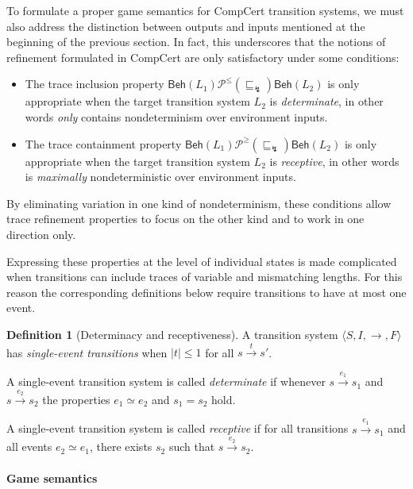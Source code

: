 \documentclass[11pt,oneside]{book}
\theoremstyle{definition}
\newtheorem{definition}[theorem]{Definition}
\newcommand{\kw}[1]{\ensuremath{ \mathsf{#1} }}
\newcommand{\refby}{\sqsubseteq} %
\begin{document}
To formulate a proper game semantics for
CompCert transition systems,
we must also address the distinction between
outputs and inputs mentioned
at the beginning of the previous section.
In fact,
this underscores that
the notions of refinement
formulated in CompCert
are only satisfactory under some conditions:
\begin{itemize}
  \item
    The trace inclusion property
    $\kw{Beh}(L_1)
     \mathrel{\mathcal{P}^\le(\refby_\lightning)}
     \kw{Beh}(L_2)$
    is only appropriate when
    the target transition system $L_2$
    is \emph{determinate},
    in other words \emph{only} contains nondeterminism
    over environment inputs.
  \item
    The trace containment property
    $\kw{Beh}(L_1)
     \mathrel{\mathcal{P}^\ge(\refby_\lightning)}
     \kw{Beh}(L_2)$
    is only appropriate when
    the target transition system $L_2$
    is \emph{receptive},
    in other words is \emph{maximally} nondeterministic
    over environment inputs.
\end{itemize}
By eliminating variation in one kind of nondeterminism,
these conditions allow trace refinement properties
to focus on the other kind
and to work in one direction only.

Expressing these properties at the level of individual states
is made complicated when transitions can include
traces of variable and mismatching lengths.
For this reason the corresponding definitions below
require transitions to have at most one event.

\begin{definition}[Determinacy and receptiveness] %
A transition system
$\langle S, I, {\rightarrow}, F \rangle$
has \emph{single-event transitions}
when $|t| \le 1$ for all $s \stackrel{t}{\rightarrow} s'$.

A single-event transition system is called
\emph{determinate}
if whenever
$s \stackrel{e_1}{\longrightarrow} s_1$ and
$s \stackrel{e_2}{\longrightarrow} s_2$
the properties $e_1 \simeq e_2$ and $s_1 = s_2$ hold.

A single-event transition system is called
\emph{receptive}
if for all transitions $s \stackrel{e_1}{\longrightarrow} s_1$
and all events $e_2 \simeq e_1$,
there exists $s_2$ such that
$s \stackrel{e_2}{\longrightarrow} s_2$.
\end{definition}

\paragraph{Game semantics}
\end{document}

